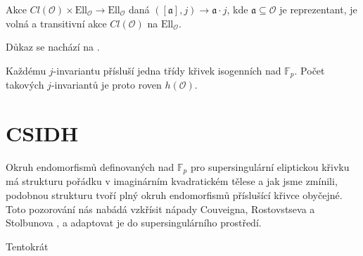 \documentclass[12pt]{report}
\begin{document}
\begin{veta}
Akce $Cl(\mathcal{O}) \times \mathrm{Ell}_{\mathcal{O}} \longrightarrow \mathrm{Ell}_{\mathcal{O}}$ daná $([\mathfrak{a}],j) \longrightarrow \mathfrak{a} \cdot j$, kde $\mathfrak{a} \subseteq \mathcal{O}$ je reprezentant, je volná a transitivní akce $Cl(\mathcal{O})$ na $\mathrm{Ell}_{\mathcal{O}}$.
\end{veta}
Důkaz se nachází na \cite[Thm. 4.5]{Waterhouse}.

Každému $j$-invariantu přísluší jedna třídy křivek isogenních nad $\mathbb{F}_p$. Počet takových $j$-invariantů je proto roven $h (\mathcal{O})$.

\section{CSIDH}

Okruh endomorfismů definovaných nad $\mathbb{F}_p$ pro supersingulární eliptickou křivku má strukturu pořádku v imaginárním kvadratickém tělese a jak jsme zmínili, podobnou strukturu tvoří plný okruh endomorfismů příslušící křivce obyčejné. Toto pozorování nás nabádá vzkřísit nápady Couveigna, Rostovstseva a Stolbunova \cite{Couveignes}, \cite{Stolbunov} a adaptovat je do supersingulárního prostředí.

Tentokrát
\end{document}
